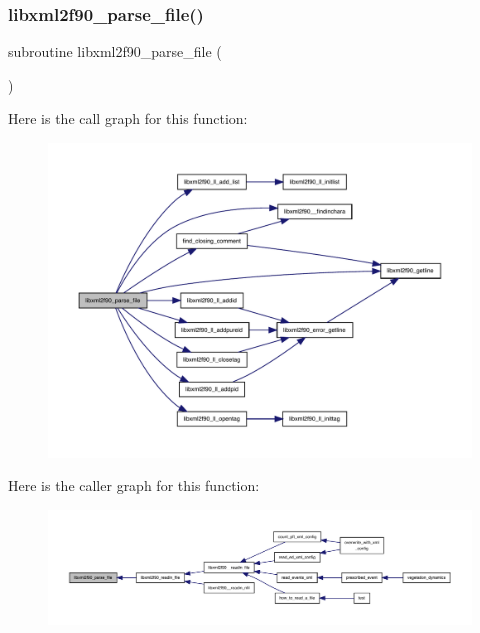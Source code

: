 \subsubsection{\texorpdfstring{libxml2f90\+\_\+parse\+\_\+file()}{libxml2f90\_parse\_file()}}
{\footnotesize\ttfamily subroutine libxml2f90\+\_\+parse\+\_\+file (\begin{DoxyParamCaption}{ }\end{DoxyParamCaption})}

Here is the call graph for this function\+:
\nopagebreak
\begin{figure}[H]
\begin{center}
\leavevmode
\includegraphics[width=350pt]{libxml2f90_8f90__pp_8f90_a41bf2706485a325b4b1515c83ac50a67_cgraph}
\end{center}
\end{figure}
Here is the caller graph for this function\+:
\nopagebreak
\begin{figure}[H]
\begin{center}
\leavevmode
\includegraphics[width=350pt]{libxml2f90_8f90__pp_8f90_a41bf2706485a325b4b1515c83ac50a67_icgraph}
\end{center}
\end{figure}
\mbox{\label{libxml2f90_8f90__pp_8f90_af6b4f4c6b9bd06993e7ab5cb607e7228}} 
